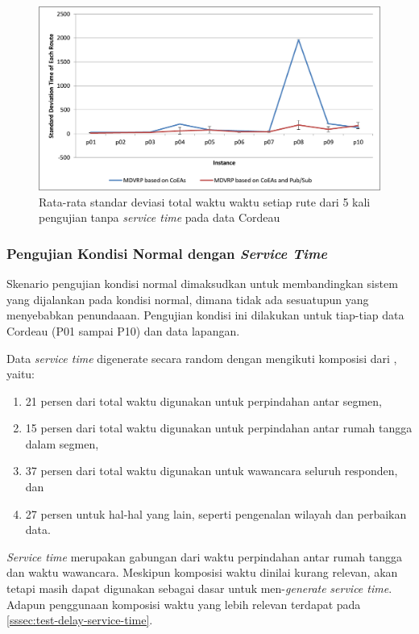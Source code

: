 \begin{figure}[!]
	\centering
	\includegraphics[width=\textwidth]{Resources/Images/test_result_10_cordeau_standard_deviation}
	\caption{Rata-rata standar deviasi total waktu waktu setiap rute dari 5 kali pengujian tanpa \textit{service time} pada data Cordeau}
	\label{fig:test_result_10_cordeau_standard_deviation}
\end{figure}


\subsubsection{Pengujian Kondisi Normal dengan \textit{Service Time}}
\label{ssec:test-normal-service-time}
Skenario pengujian kondisi normal dimaksudkan untuk membandingkan sistem yang dijalankan pada kondisi normal, dimana tidak ada sesuatupun yang menyebabkan penundaaan. Pengujian kondisi ini dilakukan untuk tiap-tiap data Cordeau (P01 sampai P10) dan data lapangan. 


Data \textit{service time} digenerate secara random dengan mengikuti komposisi dari \citep{sudman_time_1965}, yaitu:
\begin{enumerate}
	\item 21 persen dari total waktu digunakan untuk perpindahan antar segmen, 
	\item 15 persen dari total waktu digunakan untuk perpindahan antar rumah tangga dalam segmen, 
	\item 37 persen dari total waktu digunakan untuk wawancara seluruh responden, dan 
	\item 27 persen untuk hal-hal yang lain, seperti pengenalan wilayah dan perbaikan data.
\end{enumerate}
\textit{Service time} merupakan gabungan dari waktu perpindahan antar rumah tangga dan waktu wawancara. Meskipun komposisi waktu \citep{sudman_time_1965} dinilai kurang relevan, akan tetapi masih dapat digunakan sebagai dasar untuk men-\textit{generate} \textit{service time}. Adapun penggunaan komposisi waktu yang lebih relevan terdapat pada \autoref{sssec:test-delay-service-time}.


